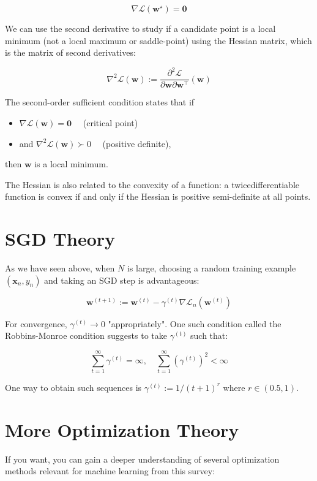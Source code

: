 \documentclass[10pt]{article}
\begin{document}
$$
\nabla \mathcal{L}\left(\mathbf{w}^{\star}\right)=\mathbf{0}
$$

We can use the second derivative to study if a candidate point is a local minimum (not a local maximum or saddle-point) using the Hessian
matrix, which is the matrix of second derivatives:

$$
\nabla^{2} \mathcal{L}(\mathbf{w}):=\frac{\partial^{2} \mathcal{L}}{\partial \mathbf{w} \partial \mathbf{w}^{\top}}(\mathbf{w})
$$

The second-order sufficient condition states that if

\begin{itemize}
  \item $\nabla \mathcal{L}(\mathbf{w})=\mathbf{0} \quad$ (critical point)
  \item and $\nabla^{2} \mathcal{L}(\mathbf{w}) \succ 0 \quad$ (positive definite),
\end{itemize}

then $\mathbf{w}$ is a local minimum.

The Hessian is also related to the convexity of a function: a twicedifferentiable function is convex if and only if the Hessian is positive semi-definite at all points.

\section*{SGD Theory}
As we have seen above, when $N$ is large, choosing a random training example $\left(\mathbf{x}_{n}, y_{n}\right)$ and taking an SGD step is advantageous:

$$
\mathbf{w}^{(t+1)}:=\mathbf{w}^{(t)}-\gamma^{(t)} \nabla \mathcal{L}_{n}\left(\mathbf{w}^{(t)}\right)
$$

For convergence, $\gamma^{(t)} \rightarrow 0$ "appropriately". One such condition called the Robbins-Monroe condition suggests to take $\gamma^{(t)}$ such that:

$$
\sum_{t=1}^{\infty} \gamma^{(t)}=\infty, \quad \sum_{t=1}^{\infty}\left(\gamma^{(t)}\right)^{2}<\infty
$$

One way to obtain such sequences is $\gamma^{(t)}:=1 /(t+1)^{r}$ where $r \in(0.5,1)$.

\section*{More Optimization Theory}
If you want, you can gain a deeper understanding of several optimization methods relevant for machine learning from this survey:
\end{document}
